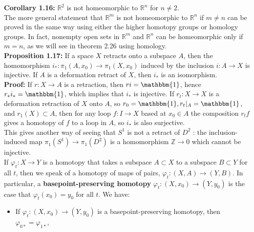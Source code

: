 \documentclass[a4paper]{article}
\begin{document}
 \textbf{Corollary 1.16:} $\mathbb{R}^2$ is not homeomorphic to
 $\mathbb{R}^{n}$ for $n\neq 2$.\\
 \linebreak
 The more general statement that $\mathbb{R}^{m}$ is not homeomorphic to
 $\mathbb{R}^{n}$ if $m\neq n$ can be proved in the same way using either the
 higher homotopy groups or homology groups. In fact, nonempty open sets in
 $\mathbb{R}^{m}$ and $\mathbb{R}^{n}$ can be homeomorphic only if $m = n$, as
 we will see in theorem 2.26 using homology.\\
 \linebreak
 \textbf{Proposition 1.17:} If a space $X$ retracts onto a subspace $A$, then
 the homomorphism $i_*  \colon \pi_1 \left( A, x_0 \right) \to 
 \pi_1 \left( X, x_0 \right) $ induced by the inclusion $i  \colon
 A \to X$ is injective. If $A$ is a deformation retract of $X$, then $i_*$ is
 an isomorphism.\\
 \linebreak
 \textbf{Proof:} If $r  \colon X \to A$ is a retraction, then
 $r i = \mathbbm{1}$, hence $r_* i_* = \mathbbm{1}$, which implies that
 $i_*$ is injective. If $r_t  \colon X\to X$ is a deformation retraction of
 $X$ onto $A$, so $r_0 = \mathbbm{1}, r_t|_{A} = \mathbbm{1}$, and $r_1(X)
 \subset A$, then for any loop $f \colon I \to X$ based at $x_0 \in A$ the
 composition $r_t f$ gives a homotopy of $f$ to a loop in $A$, so $i_*$ is also
 surjective.\\
 \linebreak
 This gives another way of seeing that $S^{1}$ is not a retract of $D^2$ :
 the inclusion-induced map $\pi_1 (S^{1}) \to \pi_1 \left( D^2 \right) $ 
 is a homomorphism $\mathbb{Z} \to 0$ which cannot be injective.\\
 \linebreak
 If $\varphi_t  \colon X \to Y$ is a homotopy that takes a subspace
 $A \subset X$ to a subspace $B \subset Y$ for all $t$, then we speak of
 a homotopy of maps of pairs, $\varphi_t  \colon \left( X,A \right) \to \left(
 Y,B\right) $. In particular, a \textbf{basepoint-preserving homotopy}
 $\varphi_t  \colon \left( X, x_0 \right) \to \left( Y, y_0 \right) $ is the
 case that $\varphi_t (x_0) = y_0$ for all $t$. We have:
\begin{itemize}
    \item If $\varphi_t  \colon \left( X, x_0 \right) \to \left( Y, y_0 \right) $ 
        is a basepoint-preserving homotopy, then
        $\varphi_{0*} = \varphi_{1*}$,
\end{itemize}
\end{document}
